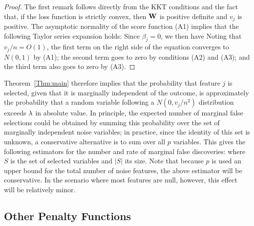 \begin{proof}
  The first remark follows directly from the KKT conditions and the fact that, if the loss function is strictly convex, then $\mathbf{W}$ is positive definite and $v_j$ is positive.  The asymptotic normality of the score function (A1) implies that the following Taylor series expansion holds:
Since $\beta_j=0$, we then have
Noting that $v_j/n=O(1)$, the first term on the right side of the equation converges to $N(0,1)$ by (A1); the second term goes to zero by conditions (A2) and (A3); and the third term also goes to zero by (A3).
\end{proof}

Theorem~\ref{Thm:main} therefore implies that the probability that feature $j$ is selected, given that it is marginally independent of the outcome, is approximately the probability that a random variable following a $N(0, v_j/n^2)$ distribution exceeds $\lambda$ in absolute value.
In principle, the expected number of marginal false selections could be obtained by summing this probability over the set of marginally independent noise variables; in practice, since the identity of this set is unknown, a conservative alternative is to sum over all $p$ variables.
This gives the following estimators for the number and rate of marginal false discoveries:
where $S$ is the set of selected variables and $|S|$ its size.  Note that because $p$ is used an upper bound for the total number of noise features, the above estimator will be conservative.  In the scenario where most features are null, however, this effect will be relatively minor.

\subsection{Other Penalty Functions}

